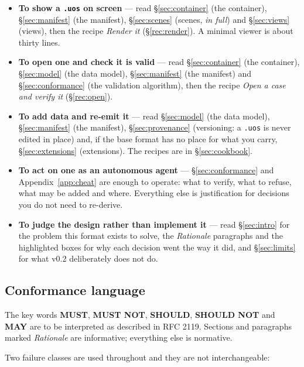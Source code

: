 \documentclass[11pt,a4paper]{article}
\newcommand{\MUST}{\textcolor{uosred}{\textbf{MUST}}}
\newcommand{\MUSTNOT}{\textcolor{uosred}{\textbf{MUST NOT}}}
\newcommand{\SHOULD}{\textcolor{uosamber}{\textbf{SHOULD}}}
\newcommand{\SHOULDNOT}{\textcolor{uosamber}{\textbf{SHOULD NOT}}}
\newcommand{\MAY}{\textcolor{uosgreen}{\textbf{MAY}}}
\newcommand{\code}[1]{\texttt{\small #1}}
\begin{document}
\begin{itemize}[leftmargin=1.2em]
  \item \textbf{To show a \code{.uos} on screen} --- read \S\ref{sec:container} (the
  container), \S\ref{sec:manifest} (the manifest), \S\ref{sec:scenes} (scenes,
  \emph{in full}) and \S\ref{sec:views} (views), then the recipe \emph{Render it}
  (\S\ref{rec:render}). A minimal viewer is about thirty lines.

  \item \textbf{To open one and check it is valid} --- read \S\ref{sec:container} (the
  container), \S\ref{sec:model} (the data model), \S\ref{sec:manifest} (the manifest) and
  \S\ref{sec:conformance} (the validation algorithm), then the recipe \emph{Open a case
  and verify it} (\S\ref{rec:open}).

  \item \textbf{To add data and re-emit it} --- read \S\ref{sec:model} (the data model),
  \S\ref{sec:manifest} (the manifest), \S\ref{sec:provenance} (versioning: a \code{.uos}
  is never edited in place) and, if the base format has no place for what you carry,
  \S\ref{sec:extensions} (extensions). The recipes are in \S\ref{sec:cookbook}.

  \item \textbf{To act on one as an autonomous agent} --- \S\ref{sec:conformance} and
  Appendix~\ref{app:cheat} are enough to operate: what to verify, what to refuse, what may
  be added and where. Everything else is justification for decisions you do not need to
  re-derive.

  \item \textbf{To judge the design rather than implement it} --- read \S\ref{sec:intro}
  for the problem this format exists to solve, the \emph{Rationale} paragraphs and the
  highlighted boxes for why each decision went the way it did, and \S\ref{sec:limits} for
  what v0.2 deliberately does not do.
\end{itemize}

\subsection{Conformance language}

The key words \MUST, \MUSTNOT, \SHOULD, \SHOULDNOT{} and \MAY{} are to be interpreted as
described in RFC 2119. Sections and paragraphs marked \emph{Rationale} are informative;
everything else is normative.

Two failure classes are used throughout and they are not interchangeable:
\end{document}
